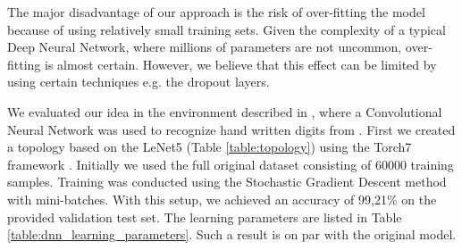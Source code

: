 \documentclass{llncs}
\begin{document}
The major disadvantage of our approach is the risk of over-fitting the model because of using relatively small training sets. Given the complexity of a typical Deep Neural Network, where millions of parameters are not uncommon, over-fitting is almost certain. However, we believe that this effect can be limited by using certain techniques e.g. the dropout layers. 

We evaluated our idea in the environment described in \cite{LeCun1998}, where a Convolutional Neural Network was used to recognize hand written digits from \cite{lecun-mnisthandwrittendigit-2010}. First we created a topology based on the LeNet5 (Table \ref{table:topology}) using the Torch7 framework \cite{Collobert2011}. Initially we used the full original dataset consisting of 60000 training samples. Training was conducted using the Stochastic Gradient Descent method with mini-batches. With this setup, we achieved an accuracy of 99,21\% on the provided validation test set. The learning parameters are listed in Table \ref{table:dnn_learning_parameters}. Such a result is on par with the original model. 
\end{document}
